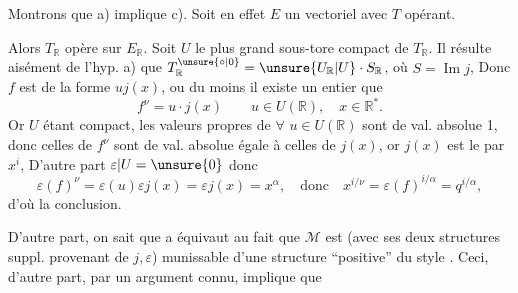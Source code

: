 
 Montrons que a) implique c). Soit en effet  $E$ un vectoriel   avec $T$ opérant.


Alors $T_{\mathbb R}$ opère sur $E_{\mathbb R}$. Soit $U$ le plus grand sous-tore compact de $T_{\mathbb R}$. Il résulte aisément de l'hyp. a) que $T_{\mathbb R}^{\unsure{\circ|0}}=\unsure{U_{\mathbb R}|U}\cdot S_{\mathbb R}$, où $S=\operatorname{Im}j$,   Donc $f$ est de la forme $uj(x)$, ou du moins il existe un entier   que
\[
f^\nu=u\cdot j(x)\qquad u\in U(\mathbb R),\quad x\in\mathbb R^*.
\]
Or $U$ étant compact, les valeurs propres de $\forall$ $u\in U(\mathbb R)$ sont de val. absolue 1, donc celles de $f^\nu$ sont de val. absolue égale à celles de $j(x)$, or $j(x)$ est le    par $x^i$,  D'autre part  $\varepsilon|U=\unsure{0}$ donc
\[
\varepsilon(f)^\nu=\varepsilon(u)\varepsilon j(x)=\varepsilon j(x)=x^\alpha,
\quad\text{donc}\quad x^{i/\nu}=\varepsilon(f)^{i/\alpha}=q^{i/\alpha},
\]
d'où la conclusion.


D'autre part, on sait que a équivaut au fait que $\mathcal M$ est (avec ses deux structures suppl. provenant de $j,\varepsilon$) munissable d'une structure ``positive'' du style . Ceci, d'autre part, par un argument connu, implique que

